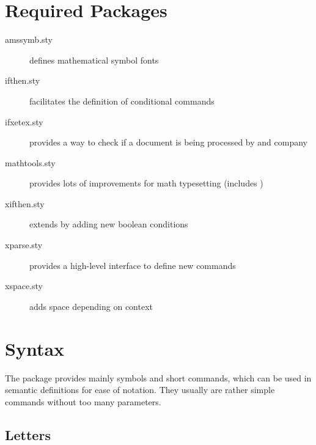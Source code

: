 \documentclass[english,a4paper,DIV=12,parskip=full,oneside]{scrartcl}
\begin{document}
    \section{Required Packages}
        \label{sec:required-packages}
        \begin{description}
            \item[amssymb.sty] defines mathematical symbol fonts
            \item[ifthen.sty] facilitates the definition of conditional commands
            \item[ifxetex.sty] provides a way to check if a document is being processed by \XeTeX{} and company
            \item[mathtools.sty] provides lots of improvements for math typesetting (includes )
            \item[xifthen.sty] extends  by adding new boolean conditions
            \item[xparse.sty] provides a high-level interface to define new commands
            \item[xspace.sty] adds space depending on context
        \end{description}


    \section{Syntax}
        \label{sec:syntax}

    The  package provides mainly symbols and short commands, which can be used in semantic definitions for ease of notation.
    They usually are rather simple commands without too many parameters.


    \subsection{Letters}
        \label{subsec:letters}
\end{document}
